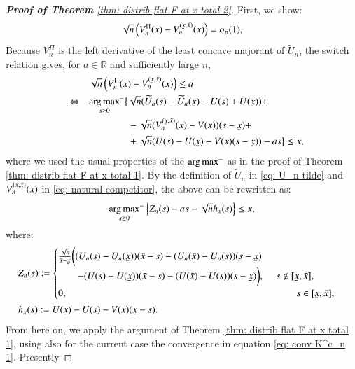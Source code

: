 \begin{proof}[\hypertarget{proof of thm 1 b}{\textbf{Proof of Theorem}} \ref{thm: distrib flat F at x total 2}]
First, we show:
\begin{align}\label{first statement thm 1.b}
        \sqrt{n} \left(  V^{\Pi}_n(x) -V^{(\ubar{x},\bar{x})}_n (x) \right) = o_p(1),
\end{align}
Because $V_n^{\Pi}$ is the left derivative of the least concave majorant of $\widetilde{U}_n$, the switch relation gives, for $a \in \mathbb{R}$ and sufficiently large $n$,
\begin{align*}
    &\sqrt{n} \left(   V^{\Pi}_n(x) -V^{(\ubar{x},\bar{x})}_n (x) \right) \leq a \quad \\
    \quad \Leftrightarrow \quad  &{\argmax_{s \geq 0}}^{-} \big\{ \sqrt{n} (\widetilde{U}_n (s) - \widetilde{U}_n(\ubar{x}) - U (s) + U(\ubar{x}) ) + \\
    &\quad \quad \quad \quad - \sqrt{n} (V^{(\ubar{x},\bar{x})}_n (x) - V(x)) (s - \ubar{x}) + \\
    &\quad \quad \quad \quad + \sqrt{n}(U(s) - U(\ubar{x}) - V(x)(s-\ubar{x}) )  -  a s  \big\} \leq x,
\end{align*}
where we used the usual properties of the ${\operatorname*{arg\,max}}^{-}$ as in the proof of Theorem \ref{thm: distrib flat F at x total 1}. By the definition of $\widetilde{U}_n$ in \eqref{eq: U_n tilde} and $V^{(\ubar{x},\bar{x})}_n (x)$ in \eqref{eq: natural competitor}, the above can be rewritten as:
\begin{align*}
    {\operatorname*{arg\,max}_{s \geq 0}}^{-} \left\{ Z_n(s) - a s - \sqrt{n} h_x(s) \right\} \leq x,
\end{align*}
where:
\begin{align*}
    &Z_n(s) := \begin{cases}
        \frac{\sqrt{n}}{\bar{x}-\ubar{x}} \bigg( (U_n(s)- U_n(\ubar{x})) (\bar{x} - s) - (U_n(\bar{x}) - U_n(s))(s - \ubar{x}) \\
        \quad \quad - (U(s)- U(\ubar{x})) (\bar{x} - s) - (U(\bar{x}) - U(s))(s - \ubar{x})\bigg),   \quad \: s \notin [\ubar{x},\bar{x}],\\
        0,  \quad \quad \quad \quad \quad \quad \quad \quad \quad \quad \quad \quad \quad \quad \quad \quad \quad \quad \quad \quad \quad \quad  \quad \: \: s \in [\ubar{x},\bar{x}],
    \end{cases}\\ 
    &h_x(s) := U(\ubar{x}) - U(s) - V(x)(\ubar{x}-s).
\end{align*}
From here on, we apply the argument of Theorem \ref{thm: distrib flat F at x total 1}, using also for the current case the convergence in equation \ref{eq: conv K^c_n 1}. Presently

\end{proof}
